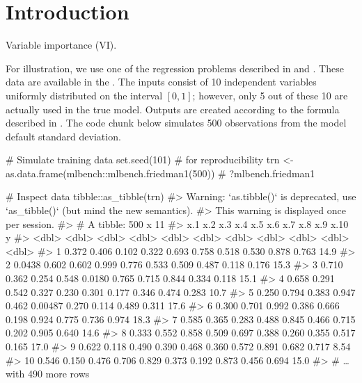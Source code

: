\section{Introduction}

Variable importance (VI).

For illustration, we use one of the regression problems described in \citet{multivariate-friedman-1991} and \citet{bagging-breiman-1996}. These data are available in the  \citep{mlbench-pkg}. The inputs consist of 10 independent variables uniformly distributed on the interval $\left[0,1\right]$; however, only 5 out of these 10 are actually used in the true model. Outputs are created according to the formula described in . The code chunk below simulates 500 observations from the model default standard deviation.

\begin{example}
# Simulate training data
set.seed(101)  # for reproducibility
trn <- as.data.frame(mlbench::mlbench.friedman1(500))  # ?mlbench.friedman1

# Inspect data
tibble::as_tibble(trn)
#> Warning: `as.tibble()` is deprecated, use `as_tibble()` (but mind the new semantics).
#> This warning is displayed once per session.
#> # A tibble: 500 x 11
#>       x.1   x.2   x.3   x.4    x.5     x.6   x.7   x.8   x.9  x.10     y
#>     <dbl> <dbl> <dbl> <dbl>  <dbl>   <dbl> <dbl> <dbl> <dbl> <dbl> <dbl>
#>  1 0.372  0.406 0.102 0.322 0.693  0.758   0.518 0.530 0.878 0.763 14.9 
#>  2 0.0438 0.602 0.602 0.999 0.776  0.533   0.509 0.487 0.118 0.176 15.3 
#>  3 0.710  0.362 0.254 0.548 0.0180 0.765   0.715 0.844 0.334 0.118 15.1 
#>  4 0.658  0.291 0.542 0.327 0.230  0.301   0.177 0.346 0.474 0.283 10.7 
#>  5 0.250  0.794 0.383 0.947 0.462  0.00487 0.270 0.114 0.489 0.311 17.6 
#>  6 0.300  0.701 0.992 0.386 0.666  0.198   0.924 0.775 0.736 0.974 18.3 
#>  7 0.585  0.365 0.283 0.488 0.845  0.466   0.715 0.202 0.905 0.640 14.6 
#>  8 0.333  0.552 0.858 0.509 0.697  0.388   0.260 0.355 0.517 0.165 17.0 
#>  9 0.622  0.118 0.490 0.390 0.468  0.360   0.572 0.891 0.682 0.717  8.54
#> 10 0.546  0.150 0.476 0.706 0.829  0.373   0.192 0.873 0.456 0.694 15.0 
#> # … with 490 more rows
\end{example}


